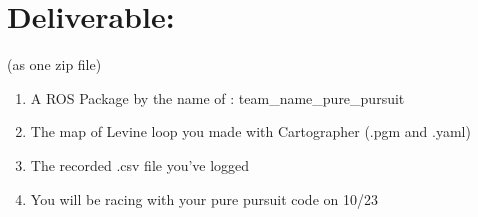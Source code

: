 \documentclass[letta4 paper]{article}
\begin{document}
\section{Deliverable:}
(as one zip file)
\begin{enumerate}
    \item A ROS Package by the name of : team\_name\_pure\_pursuit 
    \item The map of Levine loop you made with Cartographer (.pgm and .yaml)
    \item The recorded .csv file you've logged
    \item You will be racing with your pure pursuit code on 10/23
\end{enumerate}{}
\end{document}
